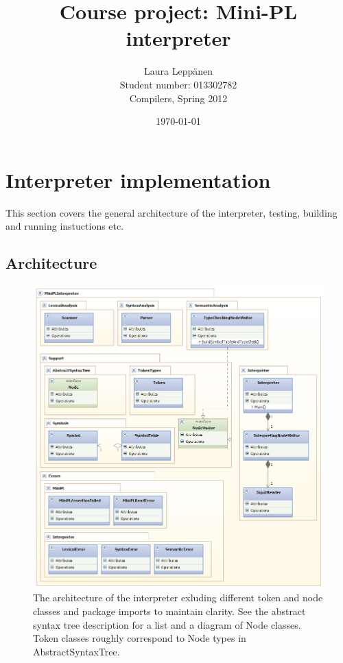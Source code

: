 \documentclass[a4paper,11pt]{article}
\begin{document}
\title{Course project: Mini-PL interpreter}
\author{Laura Leppänen \\ Student number: 013302782 \\ Compilers, Spring 2012}
\date{\today}
\maketitle
\thispagestyle{empty}

\tableofcontents
\onehalfspacing

\newpage
\setcounter{page}{1}

\section{Interpreter implementation}

This section covers the general architecture of the interpreter, testing, building and running instuctions etc.

\subsection{Architecture}

\begin{figure}
    \includegraphics[scale=0.7]{architecture.png}
    \caption{The architecture of the interpreter exluding different token and node classes and package imports to maintain clarity. See the abstract syntax tree description for a list and a diagram of Node classes. Token classes roughly correspond to Node types in AbstractSyntaxTree.}
    \label{fig:architecture}
\end{figure}
\end{document}
